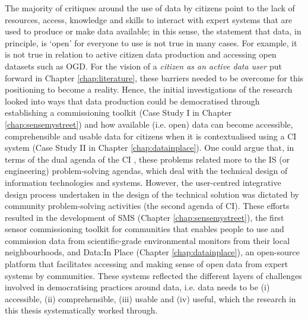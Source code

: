 The majority of critiques around the use of data by citizens point to the lack of resources, access, knowledge and skills to interact with expert systems that are used to produce or make data available; in this sense, the statement that data, in principle, is `open' for everyone to use is not true in many cases. For example, it is not true in relation to active citizen data production and accessing open datasets such as OGD. For the vision of a \textit{citizen as an active data user} put forward in Chapter \ref{chap:literature}, these barriers needed to be overcome for this positioning to become a reality. Hence, the initial investigations of the research looked into ways that data production could be democratised through establishing a commissioning toolkit (Case Study I in Chapter \ref{chap:sensemystreet}) and how available (i.e. open) data can become accessible, comprehensible and usable data for citizens when it is contextualised using a CI system (Case Study II in Chapter \ref{chap:datainplace}). One could argue that, in terms of the dual agenda of the CI \citep{stillman_community_2009}, these problems related more to the IS (or engineering) problem-solving agendas, which deal with the technical design of information technologies and systems. However, the user-centred integrative design process undertaken in the design of the technical solution was dictated by community problem-solving activities (the second agenda of CI). These efforts resulted in the development of SMS (Chapter \ref{chap:sensemystreet}), the first sensor commissioning toolkit for communities that enables people to use and commission data from scientific-grade environmental monitors from their local neighbourhoods, and Data:In Place (Chapter \ref{chap:datainplace}), an open-source platform that facilitates accessing and making sense of open data from expert systems by communities. These systems reflected the different layers of challenges involved in democratising practices around data, i.e. data needs to be (i) accessible, (ii) comprehensible, (iii) usable and (iv) useful, which the research in this thesis systematically worked through.

